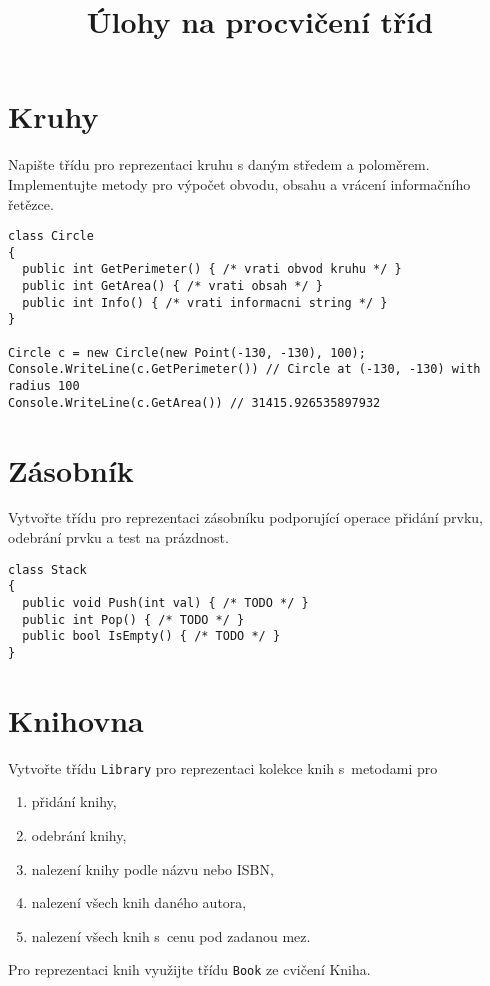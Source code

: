 \documentclass[12pt,a4paper]{article}
\begin{document}
\pagestyle{empty}
\title{Úlohy na procvičení tříd}
\date{\vspace{-12ex}}
\setlength{\droptitle}{-6em}
\setlength{\parindent}{0cm}
\maketitle

\section{Kruhy}

Napište třídu pro reprezentaci kruhu s daným středem a poloměrem. Implementujte
metody pro výpočet obvodu, obsahu a vrácení informačního řetězce.

\begin{verbatim}
class Circle
{
  public int GetPerimeter() { /* vrati obvod kruhu */ }
  public int GetArea() { /* vrati obsah */ }
  public int Info() { /* vrati informacni string */ }
}

Circle c = new Circle(new Point(-130, -130), 100);
Console.WriteLine(c.GetPerimeter()) // Circle at (-130, -130) with radius 100
Console.WriteLine(c.GetArea()) // 31415.926535897932
\end{verbatim}

\section{Zásobník}

Vytvořte třídu pro reprezentaci zásobníku podporující operace přidání prvku,
odebrání prvku a test na prázdnost.

\begin{verbatim}
class Stack
{
  public void Push(int val) { /* TODO */ }
  public int Pop() { /* TODO */ }
  public bool IsEmpty() { /* TODO */ }
}
\end{verbatim}

\section{Knihovna}

Vytvořte třídu \texttt{Library} pro reprezentaci kolekce knih s metodami pro
\begin{enumerate}
	\setlength\itemsep{0em}
	\setlength{\parskip}{0pt}
	\item přidání knihy,
	\item odebrání knihy,
	\item nalezení knihy podle názvu nebo ISBN,
	\item nalezení všech knih daného autora,
	\item nalezení všech knih s cenu pod zadanou mez.
\end{enumerate}

Pro reprezentaci knih využijte třídu \texttt{Book} ze cvičení Kniha.

\end{document}
